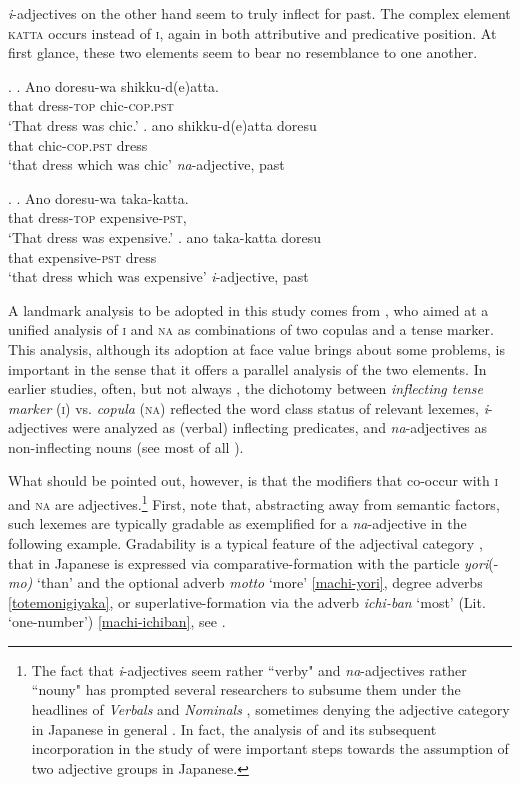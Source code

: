 \textit{i}-adjectives on the other hand seem to truly inflect for past. The complex element \textsc{katta} occurs instead of \textsc{i}, again in both attributive and predicative position. At first glance, these two elements seem to bear no resemblance to one another.

\ex. \ag. Ano doresu-wa shikku-d(e)atta.\\
that dress-\textsc{top} chic-\textsc{cop.pst}\\
`That dress was chic.'
\bg. ano shikku-d(e)atta doresu\\
that chic-\textsc{cop.pst} dress\\
`that dress which was chic' \null \hfill \textit{na}-adjective, past

\ex. \label{taka-katta} \ag. Ano doresu-wa taka-katta.\\
that dress-\textsc{top} expensive-\textsc{pst},\\
`That dress was expensive.'
\bg. ano taka-katta doresu\\
that expensive-\textsc{pst} dress\\
`that dress which was expensive' \null \hfill \textit{i}-adjective, past

A landmark analysis to be adopted in this study comes from \citet{nishiyama:1999:adj}, who aimed at a unified analysis of \textsc{i} and \textsc{na} as combinations of two copulas and a tense marker. This analysis, although its adoption at face value brings about some problems, is important in the sense that it offers a parallel analysis of the two elements. In earlier studies, often, but not always \citep{backhouse:1984:have}, the dichotomy between \textit{inflecting tense marker} (\textsc{i}) vs. \textit{copula} (\textsc{na}) reflected the word class status of relevant lexemes, \textit{i}-adjectives were analyzed as (verbal) inflecting predicates, and \textit{na}-adjectives as non-inflecting nouns (see most of all \citealt{uehara:1998:syntactic}).

What should be pointed out, however, is that the modifiers that co-occur with \textsc{i} and \textsc{na} are adjectives.\footnote{The fact that \textit{i}-adjectives seem rather ``verby" and \textit{na}-adjectives rather ``nouny" has prompted several researchers to subsume them under the headlines of \textit{Verbals} and \textit{Nominals} \citep{uehara:1998:syntactic}, sometimes denying the adjective category in Japanese in general \citep{wetzer:1996:typology}. In fact, the analysis of \citet{nishiyama:1999:adj} and its subsequent incorporation in the study of \citet{baker:2003:cat} were important steps towards the assumption of two adjective groups in Japanese.} First, note that, abstracting away from semantic factors, such lexemes are typically gradable as exemplified for a \textit{na}-adjective in the following example. Gradability is a typical feature of the adjectival category \citep{baker:2003:cat, dixon:2010:grammatical}, that in Japanese is expressed via comparative-formation with the particle \textit{yori}(-\textit{mo)} `than' and the optional adverb \textit{motto} `more' \ref{machi-yori}, degree adverbs \ref{totemonigiyaka}, or superlative-formation via the adverb \textit{ichi-ban} `most' (Lit. `one-number') \ref{machi-ichiban}, see \citet{bhatt:2011:reduced}.

